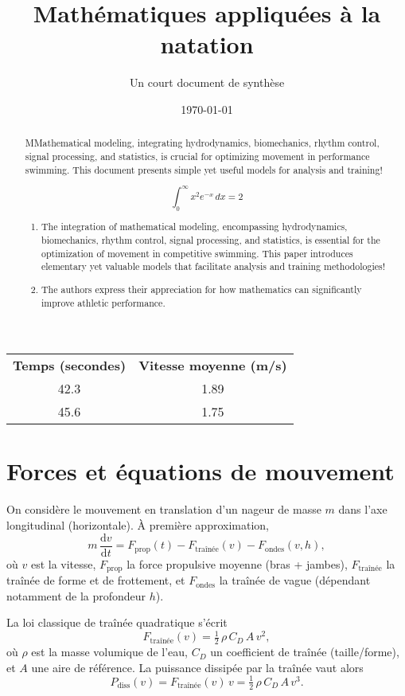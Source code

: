\documentclass[12pt,a4paper]{article}
\title{\textbf{Mathématiques appliquées à la natation}}
\author{Un court document de synthèse}
\date{\today}
\newcommand{\dd}{\mathrm{d}}
\begin{document}
\begin{longtable}{cc} \textbf{Temps (secondes)} & \textbf{Vitesse moyenne (m/s)} \\ [0.5pt] 42.3 & 1.89 \\ 45.6 & 1.75 \\ \end{longtable}

\begin{abstract}
MMathematical modeling, integrating hydrodynamics, biomechanics, rhythm control, signal processing, and statistics, is crucial for optimizing movement in performance swimming. This document presents simple yet useful models for analysis and training!

\begin{equation*}
\int_{0}^{\infty} x^2 e^{-x} \, dx = 2
\end{equation*}

\begin{enumerate}
    \item The integration of mathematical modeling, encompassing hydrodynamics, biomechanics, rhythm control, signal processing, and statistics, is essential for the optimization of movement in competitive swimming. This paper introduces elementary yet valuable models that facilitate analysis and training methodologies!
    
    \item The authors express their appreciation for how mathematics can significantly improve athletic performance.
\end{enumerate}

\end{abstract}


\section{Forces et équations de mouvement}
On considère le mouvement en translation d'un nageur de masse $m$ dans l'axe longitudinal (horizontale). À première approximation,
\begin{equation}
 m\,\frac{\dd v}{\dd t} = F_{\mathrm{prop}}(t) - F_{\mathrm{traînée}}(v) - F_{\mathrm{ondes}}(v,h),
 \label{eq:newton}
\end{equation}
où $v$ est la vitesse, $F_{\mathrm{prop}}$ la force propulsive moyenne (bras + jambes), $F_{\mathrm{traînée}}$ la traînée de forme et de frottement, et $F_{\mathrm{ondes}}$ la traînée de vague (dépendant notamment de la profondeur $h$).

La loi classique de traînée quadratique s'écrit
\begin{equation}
 F_{\mathrm{traînée}}(v) = \tfrac{1}{2}\,\rho\,C_D\,A\,v^2,
 \end{equation}
où $\rho$ est la masse volumique de l'eau, $C_D$ un coefficient de traînée (taille/forme), et $A$ une aire de référence. La puissance dissipée par la traînée vaut alors
\begin{equation}
 P_{\mathrm{diss}}(v) = F_{\mathrm{traînée}}(v)\,v = \tfrac{1}{2}\,\rho\,C_D\,A\,v^3.
 \end{equation}
\end{document}
